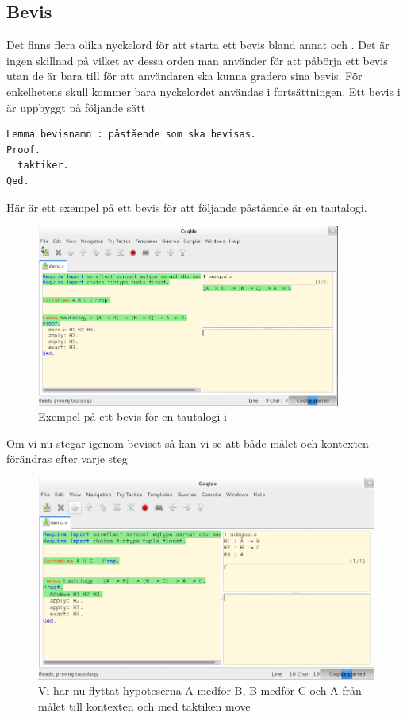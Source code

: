 \subsection{Bevis}
Det finns flera olika nyckelord för att starta ett bevis bland annat
 och . Det är ingen skillnad på vilket
av dessa orden man använder för att påbörja ett bevis utan de är bara
till för att användaren ska kunna gradera sina bevis. För enkelhetens skull
kommer bara nyckelordet  användas i fortsättningen. Ett bevis i
\coq är uppbyggt på följande sätt

\begin{lstlisting}
Lemma bevisnamn : påstående som ska bevisas.
Proof.
  taktiker.
Qed.
\end{lstlisting}

Här är ett exempel på ett bevis för att följande påstående är en tautalogi.

\begin{figure}[H]
  \centering
  \includegraphics[width=100mm]{images/Proof_part1}
  \caption[Exempel på bevis i \coq]
   {Exempel på ett bevis för en tautalogi i \coq}
\end{figure}

Om vi nu stegar igenom beviset så kan vi se att både målet och kontexten
förändras efter varje steg

\begin{figure}[H]
  \centering
  \includegraphics[width=150mm]{images/Proof_part2}
  \caption[Bevis i \coq IDE]
   {Vi har nu flyttat hypoteserna A medför B, B medför C och A
    från målet till kontexten och med taktiken move}
\end{figure}

